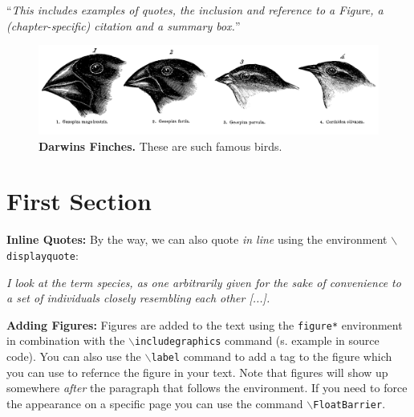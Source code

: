 ``\textit{This includes examples of quotes, the inclusion and reference to a Figure, a (chapter-specific) citation and a summary box.}''\\

\begin{multicols}{2}
\begin{figure}[!hb] %
\centering
\includegraphics[width = \fwidth]{figures/ci/finches.png}
\caption[Darwins Finches]{\label{fig:cif1}\textbf{Darwins Finches.} These are such famous birds.
}
\end{figure}

\section{First Section}

\textbf{Inline Quotes:} By the way, we can also quote \textit{in line} using the environment \texttt{$\backslash$displayquote}:

\begin{displayquote}
\textit{
I look at the term species, as one arbitrarily given for the sake of convenience to a set of individuals closely resembling each other [...].}
\hfill{}
\end{displayquote}

\textbf{Adding Figures:}
Figures are added to the text using the \texttt{figure*} environment in combination with the \texttt{$\backslash$includegraphics} command (s. example in source code).
You can also use the \texttt{$\backslash$label} command to add a tag to the figure which you can use to refernce the figure in your text.
Note that figures will show up somewhere \textit{after} the paragraph that follows the  environment. If you need to force the appearance on a specific page you can use the command \texttt{$\backslash$FloatBarrier}.


\end{multicols}
